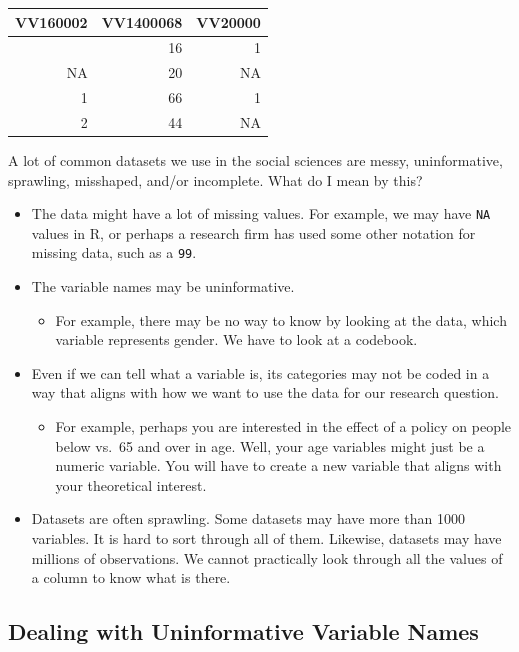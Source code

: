 \documentclass[
  letterpaper,
  DIV=11,
  numbers=noendperiod]{scrreprt}
\providecommand{\tightlist}{%
  \setlength{\itemsep}{0pt}\setlength{\parskip}{0pt}}\usepackage{longtable,booktabs,array}
\begin{document}
\begin{longtable}[]{@{}rrr@{}}
\toprule\noalign{}
VV160002 & VV1400068 & VV20000 \\
\midrule\noalign{}
\endhead
\bottomrule\noalign{}
\endlastfoot
2 & 16 & 1 \\
NA & 20 & NA \\
1 & 66 & 1 \\
2 & 44 & NA \\
\end{longtable}

A lot of common datasets we use in the social sciences are messy,
uninformative, sprawling, misshaped, and/or incomplete. What do I mean
by this?

\begin{itemize}
\tightlist
\item
  The data might have a lot of missing values. For example, we may have
  \texttt{NA} values in R, or perhaps a research firm has used some
  other notation for missing data, such as a \texttt{99}.
\item
  The variable names may be uninformative.

  \begin{itemize}
  \tightlist
  \item
    For example, there may be no way to know by looking at the data,
    which variable represents gender. We have to look at a codebook.
  \end{itemize}
\item
  Even if we can tell what a variable is, its categories may not be
  coded in a way that aligns with how we want to use the data for our
  research question.

  \begin{itemize}
  \tightlist
  \item
    For example, perhaps you are interested in the effect of a policy on
    people below vs.~65 and over in age. Well, your age variables might
    just be a numeric variable. You will have to create a new variable
    that aligns with your theoretical interest.
  \end{itemize}
\item
  Datasets are often sprawling. Some datasets may have more than 1000
  variables. It is hard to sort through all of them. Likewise, datasets
  may have millions of observations. We cannot practically look through
  all the values of a column to know what is there.
\end{itemize}

\hypertarget{dealing-with-uninformative-variable-names}{%
\subsection{Dealing with Uninformative Variable
Names}\label{dealing-with-uninformative-variable-names}}
\end{document}
